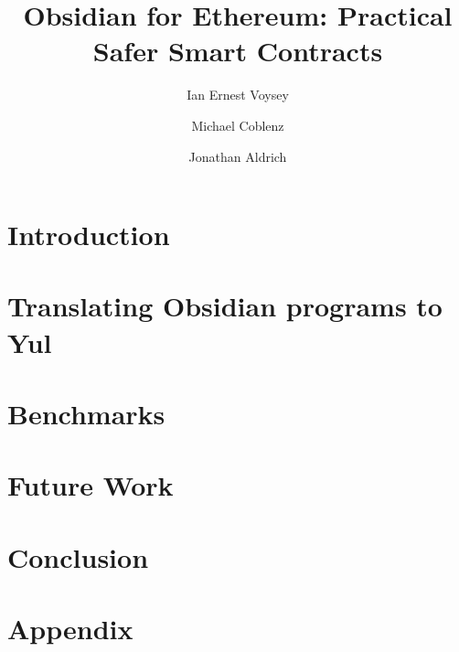 \documentclass[sigplan,nonacm,screen]{acmart}
\begin{document}
\title{Obsidian for Ethereum: Practical Safer Smart Contracts}

\author{Ian Ernest Voysey}
\cmu{}

\author{Michael Coblenz}

\author{Jonathan Aldrich}
\cmu{}

\maketitle

\section{Introduction}\label{sec:intro}


\section{Translating Obsidian programs to Yul}\label{sec:layout}


\section{Benchmarks}\label{sec:benchmarks}


\section{Future Work}\label{sec:futurework}


%

\section{Conclusion}\label{sec:conclusion}


\clearpage



\appendix
\clearpage
\section{Appendix}
\end{document}
